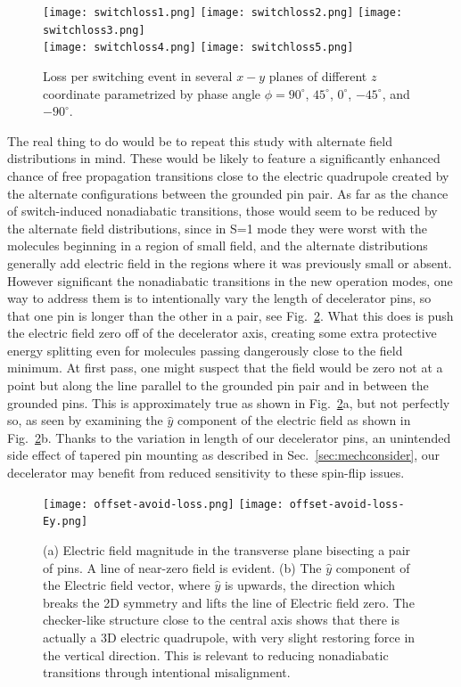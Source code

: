 \begin{figure}[t!]
\centering
\texttt{[image: switchloss1.png]}
\texttt{[image: switchloss2.png]}
\texttt{[image: switchloss3.png]}\\
\texttt{[image: switchloss4.png]}
\texttt{[image: switchloss5.png]}
\caption[Nonadiabatic Losses during Switching]{\label{nonadiabatic2}
Loss per switching event in several $x-y$ planes of different $z$ coordinate parametrized by phase angle $\phi=90^\circ$, $45^\circ$, $0^\circ$, $-45^\circ$, and $-90^\circ$.}
\end{figure}

The real thing to do would be to repeat this study with alternate field distributions in mind.
These would be likely to feature a significantly enhanced chance of free propagation transitions close to the electric quadrupole created by the alternate configurations between the grounded pin pair.
As far as the chance of switch-induced nonadiabatic transitions, those would seem to be reduced by the alternate field distributions, since in S=1 mode they were worst with the molecules beginning in a region of small field, and the alternate distributions generally add electric field in the regions where it was previously small or absent.
However significant the nonadiabatic transitions in the new operation modes, one way to address them is to intentionally vary the length of decelerator pins, so that one pin is longer than the other in a pair, see Fig.~\ref{offsetavoid}.
What this does is push the electric field zero off of the decelerator axis, creating some extra protective energy splitting even for molecules passing dangerously close to the field minimum.
At first pass, one might suspect that the field would be zero not at a point but along the line parallel to the grounded pin pair and in between the grounded pins.
This is approximately true as shown in Fig.~\ref{offsetavoid}a, but not perfectly so, as seen by examining the $\hat{y}$ component of the electric field as shown in Fig.~\ref{offsetavoid}b.
Thanks to the variation in length of our decelerator pins, an unintended side effect of tapered pin mounting as described in Sec.~\ref{sec:mechconsider}, our decelerator may benefit from reduced sensitivity to these spin-flip issues.

\begin{figure}[t!]
\centering
\texttt{[image: offset-avoid-loss.png]}
\texttt{[image: offset-avoid-loss-Ey.png]}
\caption[Fields Close to Zeros of SF Mode]{\label{offsetavoid}
(a) Electric field magnitude in the transverse plane bisecting a pair of pins. A line of near-zero field is evident.
(b) The $\hat{y}$ component of the Electric field vector, where $\hat{y}$ is upwards, the direction which breaks the 2D symmetry and lifts the line of Electric field zero. The checker-like structure close to the central axis shows that there is actually a 3D electric quadrupole, with very slight restoring force in the vertical direction. This is relevant to reducing nonadiabatic transitions through intentional misalignment.
}
\end{figure}



